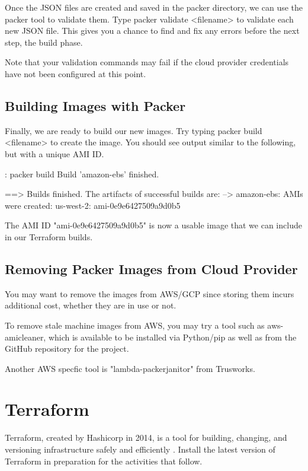 \justify
Once the JSON files are created and saved in the packer directory, we
can use the packer tool to validate them. Type
packer validate \textless{}filename\textgreater{} to validate each new
JSON file. This gives you a chance to find and fix any errors before the
next step, the build phase.

\justify
Note that your validation commands may fail if the cloud provider
credentials have not been configured at this point.

\subsection{Building Images with Packer}

\justify
Finally, we are ready to build our new images. Try typing
packer build \textless{}filename\textgreater{} to create the image. You
should see output similar to the following, but with a unique AMI ID.

\begin{mybox}{\thetcbcounter: packer build}
Build 'amazon-ebs' finished.

==> Builds finished. The artifacts of successful builds are:
--> amazon-ebs: AMIs were created:
    us-west-2: ami-0e9e6427509a9d0b5
\end{mybox}

\justify
The AMI ID "ami-0e9e6427509a9d0b5" is now a usable image that we can
include in our Terraform builds.

\subsection{Removing Packer Images from Cloud Provider}

\justify
You may want to remove the images from AWS/GCP since storing them incurs
additional cost, whether they are in use or not.

\justify
To remove stale machine images from AWS, you may try a tool such as
aws-amicleaner, which is available to be installed via Python/pip as well as from the
GitHub repository for the project.

\jusitfy
Another AWS specfic tool is "lambda-packerjanitor" from Trusworks.

\section{Terraform}
\justify
Terraform, created by Hashicorp in 2014, is a tool for building, changing, and versioning 
infrastructure safely and efficiently . Install the latest version of Terraform
in preparation for the activities that follow.

